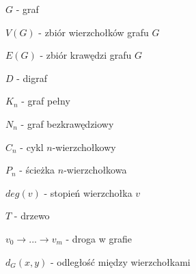 $G$ - graf

$V(G)$ - zbiór wierzchołków grafu $G$

$E(G)$ - zbiór krawędzi grafu $G$

$D$ - digraf

$K_n$ - graf pełny

$N_n$ - graf bezkrawędziowy

$C_n$ - cykl $n$-wierzchołkowy

$P_n$ - ścieżka $n$-wierzchołkowa

$deg(v)$ - stopień wierzchołka $v$

$T$ - drzewo

$v_0 \rightarrow ... \rightarrow v_m$ - droga w grafie

$d_G(x,y)$ - odległość między wierzchołkami

